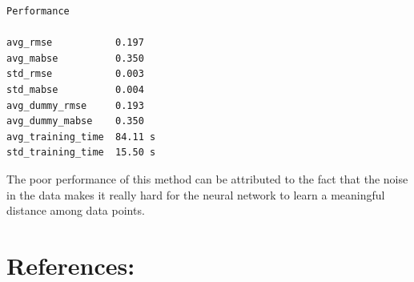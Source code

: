 \documentclass[
]{article}
\begin{document}
\begin{verbatim}
Performance

avg_rmse           0.197
avg_mabse          0.350
std_rmse           0.003
std_mabse          0.004
avg_dummy_rmse     0.193
avg_dummy_mabse    0.350
avg_training_time  84.11 s
std_training_time  15.50 s
\end{verbatim}

The poor performance of this method can be attributed to the fact that
the noise in the data makes it really hard for the neural network to
learn a meaningful distance among data points.

\section{References:}\label{references}
\end{document}

